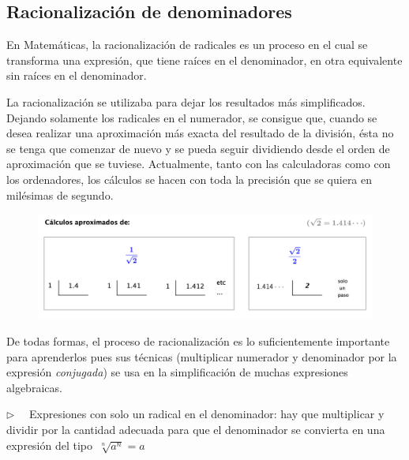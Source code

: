 \vspace{5mm}
\subsection{Racionalización de denominadores}
\vspace{0.5cm}





En Matemáticas, la racionalización de radicales es un proceso en el cual se transforma una expresión, que tiene raíces en el denominador, en otra equivalente sin raíces en el denominador.

La racionalización se utilizaba para dejar los resultados más simplificados. Dejando solamente los radicales en el numerador, se consigue que, cuando se desea realizar una aproximación más exacta del resultado de la división, ésta no se tenga que comenzar de nuevo y se pueda seguir dividiendo desde el orden de aproximación que se tuviese. Actualmente, tanto con las calculadoras como con los ordenadores, los cálculos se hacen con toda la precisión que se quiera en milésimas de segundo.

\begin{figure}[H]
	\centering
	\includegraphics[width=.8\textwidth]{img-reales/reales19.png}
	\end{figure}

De todas formas, el proceso de racionalización es lo suficientemente importante para aprenderlos pues sus técnicas (multiplicar numerador y denominador por la expresión \emph{conjugada}) se usa en la simplificación de muchas expresiones algebraicas.

\vspace{5mm}
$\triangleright\quad$ Expresiones con solo un radical en el denominador:  hay que multiplicar y dividir por la cantidad adecuada para que el denominador se convierta en una expresión del tipo $\ \sqrt[n]{a^n}=a$ 

